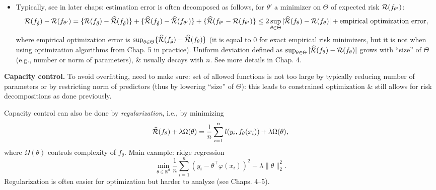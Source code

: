 \documentclass{article}
\begin{document}
\begin{enumerate}
\begin{itemize}
\begin{itemize}
\begin{itemize}
\begin{itemize}
					Estimation error $\left\{{\cal R}(f_{\hat{\theta}}) - \inf_{\theta'\in\Theta} {\cal R}(f_{\theta'}) \right\}$ is also always nonnegative \& is typically random because function $f_{\hat{\theta}}$ is random. It typically decreases in $n$ \& increases when $\Theta$ grows.
					
					Overall, typical error curves look like this {\sf Fig: Size of $\Theta$--Errors plot.}
					\item Typically, see in later chaps: estimation error is often decomposed as follows, for $\theta'$ a minimizer on $\Theta$ of expected risk ${\cal R}(f_{\theta'})$:
					\begin{equation}
						{\cal R}(f_{\hat{\theta}}) - {\cal R}(f_{\theta'}) = \{{\cal R}(f_{\hat{\theta}}) - \widehat{\cal R}(f_{\hat{\theta}})\} + \{\widehat{\cal R}(f_{\hat{\theta}}) - \widehat{\cal R}(f_{\theta'})\} + \{\widehat{\cal R}(f_{\theta'} - {\cal R}(f_{\theta'})\}\le2\sup_{\theta\in\Theta} |\widehat{\cal R}(f_\theta) - {\cal R}(f_\theta)| + \mbox{empirical optimization error},
					\end{equation}
					where empirical optimization error is $\sup_{\theta\in\Theta} \{\widehat{\cal R}(f_{\hat{\theta}}) - \widehat{\cal R}(f_\theta)\}$ (it is equal to 0 for exact empirical risk minimizers, but it is not when using optimization algorithms from Chap. 5 in practice). Uniform deviation defined as $\sup_{\theta\in\Theta} |\widehat{\cal R}(f_\theta) - {\cal R}(f_\theta)|$ grows with ``size'' of $\Theta$ (e.g., number or norm of parameters), \& usually decays with $n$. See more details in Chap. 4.
				\end{itemize}
				{\bf Capacity control.} To avoid overfitting, need to make sure: set of allowed functions is not too large by typically reducing number of parameters or by restricting norm of predictors (thus by lowering ``size'' of $\Theta$): this leads to constrained optimization \& still allows for risk decompositions as done previously.
				
				Capacity control can also be done by {\it regularization}, i.e., by minimizing
				\begin{equation}
					\widehat{\cal R}(f_\theta) + \lambda\Omega(\theta) = \frac{1}{n}\sum_{i=1}^n l(y_i,f_\theta(x_i)) + \lambda\Omega(\theta),
				\end{equation}
				where $\Omega(\theta)$ controls complexity of $f_\theta$. Main example: ridge regression
				\begin{equation}
					\min_{\theta\in\mathbb{R}^d} \frac{1}{n}\sum_{i=1}^n (y_i - \theta^\top\varphi(x_i))^2 + \lambda\|\theta\|_2^2.
				\end{equation}
				Regularization is often easier for optimization but harder to analyze (see Chaps. 4--5).
				

\end{itemize}
\end{itemize}
\end{itemize}
\end{enumerate}
\end{document}
